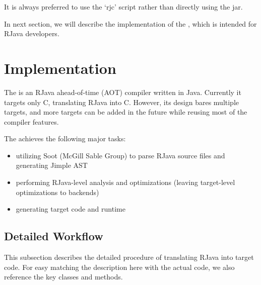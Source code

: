 \documentclass[12pt]{article}
\begin{document}
It is always preferred to use the `rjc' script rather than directly using
the \rjc jar. 

In next section, we will describe the implementation of the \rjcfull,
which is intended for RJava developers. 


\section{\rjcfull Implementation}

The \rjcfull is an RJava ahead-of-time (AOT) compiler written in Java. 
Currently it targets only C, translating RJava into C. 
However, its design bares multiple targets, 
and more targets can be added in the future while reusing most of the
compiler features. 

The \rjcfull achieves the following major tasks:
\begin{itemize}
\item utilizing Soot (McGill Sable Group) to parse RJava source files and 
generating Jimple AST
\item performing RJava-level analysis and optimizations (leaving target-level
optimizations to backends)
\item generating target code and runtime
\end{itemize}

\subsection{Detailed Workflow}

This subsection describes the detailed procedure of translating 
RJava into target code. For easy matching the description here 
with the actual code, we also reference the key classes and
methods. 
\end{document}
